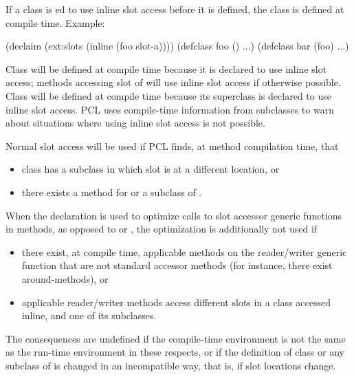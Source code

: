 If a class is ed to use inline slot access before it is
defined, the class is defined at compile time.  Example:

\begin{example}
(declaim (ext:slots (inline (foo slot-a))))
(defclass foo () ...)
(defclass bar (foo) ...)
\end{example}
  
Class  will be defined at compile time because it is
declared to use inline slot access; methods accessing slot
 of  will use inline slot access if otherwise
possible.  Class  will be defined at compile time because
its superclass  is declared to use inline slot access.  PCL
uses compile-time information from subclasses to warn about situations
where using inline slot access is not possible.

Normal slot access will be used if PCL finds, at method compilation
time, that

\begin{itemize}
\item class  has a subclass in which slot  is at a
  different location, or

\item there exists a  method for
   or a subclass of .
\end{itemize}
  
When the declaration is used to optimize calls to slot accessor
generic functions in methods, as opposed to  or
, the optimization is additionally not used if

\begin{itemize}
\item there exist, at compile time, applicable methods on the
  reader/writer generic function that are not standard accessor
  methods (for instance, there exist around-methods), or
  
\item applicable reader/writer methods access different slots in a
  class accessed inline, and one of its subclasses.
\end{itemize}

The consequences are undefined if the compile-time environment is not
the same as the run-time environment in these respects, or if the
definition of class  or any subclass of  is
changed in an incompatible way, that is, if slot locations change.

